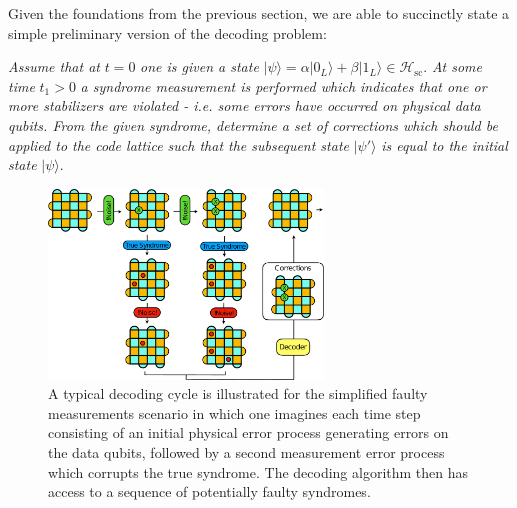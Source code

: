 \documentclass[twocolumn,preprintnumbers,amsmath,amssymb,notitlepage,nofootinbib,longbibliography,superscriptaddress,aps,pra,10pt]{revtex4-1}
\begin{document}
    Given the foundations from the previous section, we are able to succinctly state a simple preliminary version of the decoding problem:\newline

    \noindent\textit{Assume that at} $t=0$  \textit{one is given a state} $|\psi\rangle = \alpha |0_L\rangle + \beta |1_L\rangle \in \mathcal{H}_{\mathrm{sc}}.$ \textit{At some time }$t_1>0$ \textit{a syndrome measurement is performed which indicates that one or more stabilizers are violated - i.e. some errors have occurred on physical data qubits. From the given syndrome, determine a set of corrections which should be applied to the code lattice such that the subsequent state} $|\psi'\rangle$ \textit{is equal to the initial state} $|\psi\rangle.$ \newline

    \begin{figure}
      \centering
      \includegraphics[width=0.65\textwidth]{figures/decoding_problem.pdf}
      \caption{A typical decoding cycle is illustrated for the simplified faulty measurements scenario in which one imagines each time step consisting of an initial physical error process generating errors on the data qubits, followed by a second measurement error process which corrupts the true syndrome. The decoding algorithm then has access to a sequence of potentially faulty syndromes.}\label{f:decoding_problem}
    \end{figure}
\end{document}
